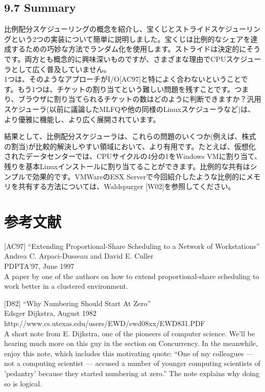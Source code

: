 \hypertarget{summary-3}{%
\subsection*{9.7 Summary}\label{summary-3}}

比例配分スケジューリングの概念を紹介し、宝くじとストライドスケジューリングという2つの実装について簡単に説明しました。宝くじは比例的なシェアを達成するための巧妙な方法でランダム化を使用します。ストライドは決定的にそうです。両方とも概念的に興味深いものですが、さまざまな理由でCPUスケジューラとして広く普及していません。\\
1つは、そのようなアプローチがI/O{[}AC97{]}と特によく合わないということです。もう1つは、チケットの割り当てという難しい問題を残すことです。つまり、ブラウザに割り当てられるチケットの数はどのように判断できますか？汎用スケジューラ(以前に議論したMLFQや他の同様のLinuxスケジューラなど)は、より優雅に機能し、より広く展開されています。

結果として、比例配分スケジューラは、これらの問題のいくつか(例えば、株式の割当)が比較的解決しやすい領域において、より有用です。たとえば、仮想化されたデータセンターでは、CPUサイクルの4分の1をWindows
VMに割り当て、残りを基本Linuxインストールに割り当てることができます。比例的な共有はシンプルで効果的です。VMWareのESX
Serverで今回紹介したような比例的にメモ\hspace{0pt}\hspace{0pt}リを共有する方法については、Waldspurger
{[}W02{]}を参照してください。

\hypertarget{ux53c2ux8003ux6587ux732e-4}{%
\section*{参考文献}\label{ux53c2ux8003ux6587ux732e-4}}

{[}AC97{]} ``Extending Proportional-Share Scheduling to a Network of
Workstations''\\
Andrea C. Arpaci-Dusseau and David E. Culler\\
PDPTA'97, June 1997\\
A paper by one of the authors on how to extend proportional-share
scheduling to work better in a clustered environment.

{[}D82{]} ``Why Numbering Should Start At Zero''\\
Edsger Dijkstra, August 1982\\
http://www.cs.utexas.edu/users/EWD/ewd08xx/EWD831.PDF\\
A short note from E. Dijkstra, one of the pioneers of computer science.
We'll be hearing much more on this guy in the section on Concurrency. In
the meanwhile, enjoy this note, which includes this motivating quote:
``One of my colleagues --- not a computing scientist --- accused a
number of younger computing scientists of 'pedantry' because they
started numbering at zero.'' The note explains why doing so is logical.

